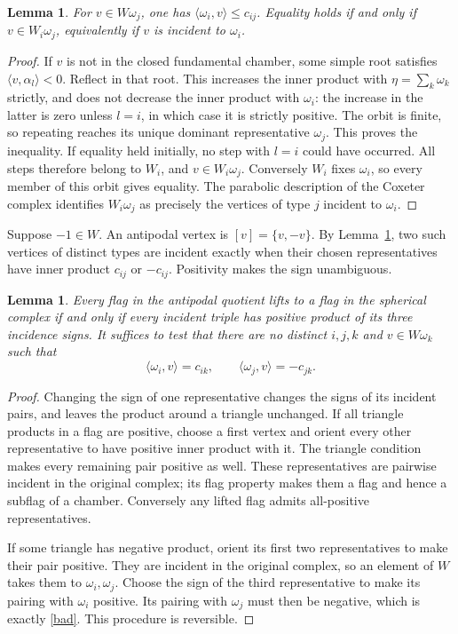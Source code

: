 \documentclass[11pt,a4paper]{article}
\newtheorem{lemma}[theorem]{Lemma}
\begin{document}
\begin{lemma}\label{dot}
For $v\in W\omega_j$, one has
$\langle\omega_i,v\rangle\leq c_{ij}$. Equality holds if and only if
$v\in W_i\omega_j$, equivalently if $v$ is incident to $\omega_i$.
\end{lemma}
\begin{proof}
If $v$ is not in the closed fundamental chamber, some simple root satisfies
$\langle v,\alpha_l\rangle<0$. Reflect in that root. This increases the
inner product with $\eta=\sum_k\omega_k$ strictly, and does not decrease
the inner product with $\omega_i$: the increase in the latter is zero
unless $l=i$, in which case it is strictly positive. The orbit is finite,
so repeating reaches its unique dominant representative $\omega_j$.
This proves the inequality. If equality held initially, no step with
$l=i$ could have occurred. All steps therefore belong to $W_i$, and
$v\in W_i\omega_j$. Conversely $W_i$ fixes $\omega_i$, so every member
of this orbit gives equality. The parabolic description of the Coxeter
complex identifies $W_i\omega_j$ as precisely the vertices of type $j$
incident to $\omega_i$.
\end{proof}

Suppose $-1\in W$. An antipodal vertex is $[v]=\{v,-v\}$. By
Lemma~\ref{dot}, two such vertices of distinct types are incident exactly
when their chosen representatives have inner product $c_{ij}$ or
$-c_{ij}$. Positivity makes the sign unambiguous.

\begin{lemma}\label{triangle}
Every flag in the antipodal quotient lifts to a flag in the spherical
complex if and only if every incident triple has positive product of
its three incidence signs. It suffices to test that there are no distinct
$i,j,k$ and $v\in W\omega_k$ such that
\begin{equation}\label{bad}
 \langle\omega_i,v\rangle=c_{ik},\qquad
 \langle\omega_j,v\rangle=-c_{jk}.
\end{equation}
\end{lemma}
\begin{proof}
Changing the sign of one representative changes the signs of its incident
pairs, and leaves the product around a triangle unchanged. If all triangle
products in a flag are positive, choose a first vertex and orient every
other representative to have positive inner product with it. The triangle
condition makes every remaining pair positive as well. These representatives
are pairwise incident in the original complex; its flag property makes them
a flag and hence a subflag of a chamber. Conversely any lifted flag admits
all-positive representatives.

If some triangle has negative product, orient its first two representatives
to make their pair positive. They are incident in the original complex,
so an element of $W$ takes them to $\omega_i,\omega_j$. Choose the sign of
the third representative to make its pairing with $\omega_i$ positive.
Its pairing with $\omega_j$ must then be negative, which is exactly
\eqref{bad}. This procedure is reversible.
\end{proof}
\end{document}
